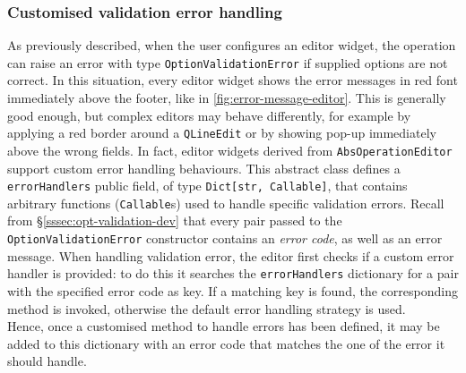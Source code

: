 \subsubsection{Customised validation error handling}\label{sssec:custom-val-errors}
As previously described, when the user configures an editor widget, the operation can raise an error with type \texttt{OptionValidationError} if supplied options are not correct. In this situation, every editor widget shows the error messages in red font immediately above the footer, like in \cref{fig:error-message-editor}. This is generally good enough, but complex editors may behave differently, for example by applying a red border around a \texttt{QLineEdit} or by showing pop-up immediately above the wrong fields. In fact, editor widgets derived from \texttt{AbsOperationEditor} support custom error handling behaviours. This abstract class defines a \texttt{errorHandlers} public field, of type \texttt{Dict[str, Callable]}, that contains arbitrary functions (\texttt{Callable}s) used to handle specific validation errors.
Recall from §\ref{sssec:opt-validation-dev} that every pair passed to the \texttt{OptionValidationError} constructor contains an \textit{error code}, as well as an error message. When handling validation error, the editor first checks if a custom error handler is
provided: to do this it searches the \texttt{errorHandlers} dictionary for a pair with the specified error code as key. If a matching key is found, the corresponding method is invoked, otherwise the default error handling strategy is used.\\
Hence, once a customised method to handle errors has been defined, it may be added to this dictionary with an error code that matches the one of the error it should handle.

